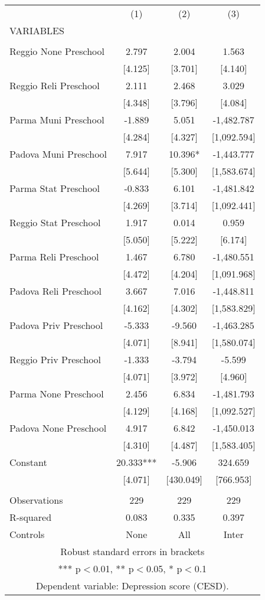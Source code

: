 \begin{tabular}{lccc} \hline
 & (1) & (2) & (3) \\
VARIABLES &  &  &  \\ \hline
 &  &  &  \\
Reggio None Preschool & 2.797 & 2.004 & 1.563 \\
 & [4.125] & [3.701] & [4.140] \\
Reggio Reli Preschool & 2.111 & 2.468 & 3.029 \\
 & [4.348] & [3.796] & [4.084] \\
Parma Muni Preschool & -1.889 & 5.051 & -1,482.787 \\
 & [4.284] & [4.327] & [1,092.594] \\
Padova Muni Preschool & 7.917 & 10.396* & -1,443.777 \\
 & [5.644] & [5.300] & [1,583.674] \\
Parma Stat Preschool & -0.833 & 6.101 & -1,481.842 \\
 & [4.269] & [3.714] & [1,092.441] \\
Reggio Stat Preschool & 1.917 & 0.014 & 0.959 \\
 & [5.050] & [5.222] & [6.174] \\
Parma Reli Preschool & 1.467 & 6.780 & -1,480.551 \\
 & [4.472] & [4.204] & [1,091.968] \\
Padova Reli Preschool & 3.667 & 7.016 & -1,448.811 \\
 & [4.162] & [4.302] & [1,583.829] \\
Padova Priv Preschool & -5.333 & -9.560 & -1,463.285 \\
 & [4.071] & [8.941] & [1,580.074] \\
Reggio Priv Preschool & -1.333 & -3.794 & -5.599 \\
 & [4.071] & [3.972] & [4.960] \\
Parma None Preschool & 2.456 & 6.834 & -1,481.793 \\
 & [4.129] & [4.168] & [1,092.527] \\
Padova None Preschool & 4.917 & 6.842 & -1,450.013 \\
 & [4.310] & [4.487] & [1,583.405] \\
Constant & 20.333*** & -5.906 & 324.659 \\
 & [4.071] & [430.049] & [766.953] \\
 &  &  &  \\
Observations & 229 & 229 & 229 \\
R-squared & 0.083 & 0.335 & 0.397 \\
 Controls & None & All & Inter \\ \hline
\multicolumn{4}{c}{ Robust standard errors in brackets} \\
\multicolumn{4}{c}{ *** p$<$0.01, ** p$<$0.05, * p$<$0.1} \\
\multicolumn{4}{c}{ Dependent variable: Depression score (CESD).} \\
\end{tabular}
